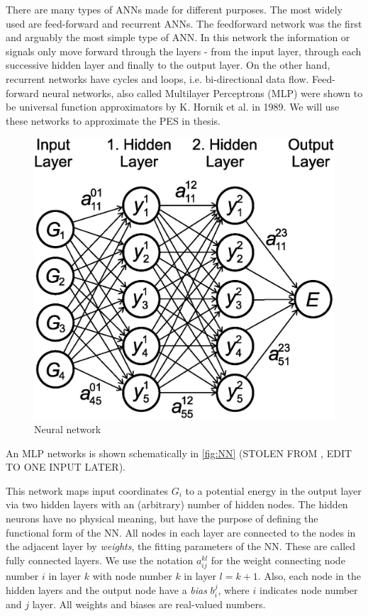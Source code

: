 \documentclass[twoside,english]{uiofysmaster}
\begin{document}
There are many types of ANNs made for different purposes. The most widely used are feed-forward and recurrent ANNs. 
The feedforward network was the first and arguably the most simple type of ANN. In this network the information or signals
only move forward through the layers - from the input layer, through each successive hidden layer and finally to the output layer. 
On the other hand, recurrent networks have cycles and loops, i.e. bi-directional data flow. Feed-forward neural networks, 
also called Multilayer Perceptrons (MLP) were shown to be universal function approximators by K. Hornik et al. \cite{Hornik89} in 1989.
We will use these networks to approximate the PES in thesis. 
\begin{figure}[H]
\begin{center}
  \includegraphics[width = 0.7\linewidth]{Figures/Theory/MLP.png}
  \caption{Neural network}
  \label{fig:NN}
  \end{center}
\end{figure}
An MLP networks is shown schematically in \autoref{fig:NN} (STOLEN FROM \cite{Behler11general}, EDIT TO ONE INPUT LATER). 

This network maps input coordinates $G_i$ to a potential energy in the output layer via two hidden layers
with an (arbitrary) number of hidden nodes. The hidden neurons have no physical meaning, but have the purpose
of defining the functional form of the NN. All nodes in each layer are connected to the nodes in the adjacent layer by
\textit{weights}, the fitting parameters of the NN. These are called fully connected layers. We use the notation
$a_{ij}^{kl}$ for the weight connecting node number $i$ in layer $k$ with node number $k$ in layer $l=k+1$. 
Also, each node in the hidden layers and the output node have a \textit{bias} $b_i^j$, where $i$ indicates
node number and $j$ layer. All weights and biases are real-valued numbers.
\end{document}

